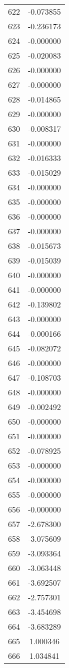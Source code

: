 \documentclass[12pt]{article}
\begin{document}
\begin{longtable}{@{}cc@{}}
622 & -0.073855 \\
623 & -0.236173 \\
624 & -0.000000 \\
625 & -0.020083 \\
626 & -0.000000 \\
627 & -0.000000 \\
628 & -0.014865 \\
629 & -0.000000 \\
630 & -0.008317 \\
631 & -0.000000 \\
632 & -0.016333 \\
633 & -0.015029 \\
634 & -0.000000 \\
635 & -0.000000 \\
636 & -0.000000 \\
637 & -0.000000 \\
638 & -0.015673 \\
639 & -0.015039 \\
640 & -0.000000 \\
641 & -0.000000 \\
642 & -0.139802 \\
643 & -0.000000 \\
644 & -0.000166 \\
645 & -0.082072 \\
646 & -0.000000 \\
647 & -0.108703 \\
648 & -0.000000 \\
649 & -0.002492 \\
650 & -0.000000 \\
651 & -0.000000 \\
652 & -0.078925 \\
653 & -0.000000 \\
654 & -0.000000 \\
655 & -0.000000 \\
656 & -0.000000 \\
657 & -2.678300 \\
658 & -3.075609 \\
659 & -3.093364 \\
660 & -3.063448 \\
661 & -3.692507 \\
662 & -2.757301 \\
663 & -3.454698 \\
664 & -3.683289 \\
665 & 1.000346 \\
666 & 1.034841 \\

\end{longtable}
\end{document}

